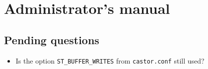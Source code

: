 
\chapter{Administrator's manual}

\section{Pending questions}
\begin{itemize}
\item{}Is the option \verb#ST_BUFFER_WRITES# from \verb#castor.conf# still used?
\end{itemize}

